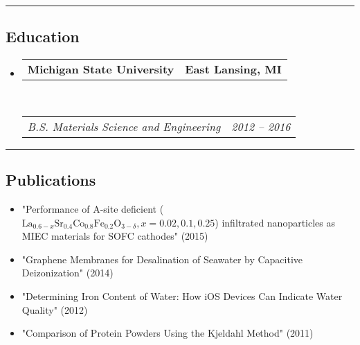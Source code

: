 \documentclass[10pt,letterpaper]{article}
\makeatletter
\newcommand{\headerrow}[2]
{\begin{tabular*}{\linewidth}{l@{\extracolsep{\fill}}r}
  #1 &
  #2 \\
\end{tabular*}}
\makeatother
\begin{document}
\hrule
\vspace{-0.4em}
\subsection*{Education}

\begin{itemize}
  \parskip=0.1em

  \item 
  \headerrow
    {\textbf{Michigan State University}}
    {\textbf{East Lansing, MI}}
  \\
  \headerrow
    {\emph{B.S. Materials Science and Engineering}}
    {\emph{2012 -- 2016}}

\end{itemize}


\hrule
\vspace{-0.4em}
\subsection*{Publications}

\begin{itemize}
  \parskip=0.1em

  \item "Performance of A-site deficient ($\text{La}_{0.6-x}\text{Sr}_{0.4}\text{Co}_{0.8}\text{Fe}_{0.2}\text{O}_{3-\delta}, x = 0.02, 0.1, 0.25$) infiltrated nanoparticles as MIEC materials for SOFC cathodes" (2015)
  \item "Graphene Membranes for Desalination of Seawater by Capacitive Deizonization" (2014)
  \item "Determining Iron Content of Water: How iOS Devices Can Indicate Water Quality" (2012)
  \item "Comparison of Protein Powders Using the Kjeldahl Method" (2011)
\end{itemize}
\end{document}
